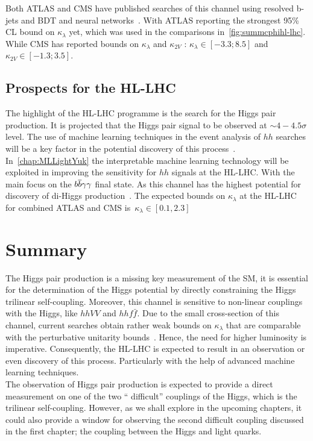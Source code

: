 Both ATLAS and CMS have published searches of this channel using resolved b-jets and BDT and neural networks~\cite{ATLAS:2021jki,CMS:2020tkr}. With ATLAS reporting the strongest 95\% CL bound on $\kappa_\lambda$ yet, which was used in the comparisons in~\autoref{fig:summcphihl-lhc}. While CMS has reported bounds on $\kappa_\lambda$ and $\kappa_{2V}$ : $\kappa_{\lambda} \in [-3.3;8.5]$ and $\kappa_{2V} \in [-1.3; 3.5]$.                                                                                       
\subsection{Prospects for the HL-LHC}
The highlight of the HL-LHC programme is the search for the Higgs pair production. It is projected that the Higgs pair signal to be observed at $\sim  4- 4.5\sigma $ level. The use of machine learning techniques in the event analysis of $hh$ searches will be a key factor in the potential discovery of this process~\cite{Cepeda:2019klc}. In~\autoref{chap:MLLightYuk} the interpretable machine learning technology will be exploited in improving the sensitivity for $hh$ signals at the HL-LHC. With the main focus on the $b\overline b\gamma\gamma$ final state. As this channel has the highest potential for discovery of di-Higgs production~\cite{Azatov:2015oxa, Baur:2003gp, Baglio:2012np, Kling:2016lay, Barger:2013jfa, Adhikary:2017jtu,Alves:2017ued}. The expected bounds on $\kappa_\lambda$ at the HL-LHC for combined ATLAS and CMS is~$\kappa_{\lambda} \in [0.1,2.3]$~\cite{DiMicco:2019ngk,Cepeda:2019klc}
 
\section{Summary \label{summtrilinear}  }
The Higgs pair production is a missing key measurement of the SM, it is essential for the determination of the Higgs potential by directly constraining the Higgs trilinear self-coupling. Moreover, this channel is sensitive to non-linear couplings with the Higgs, like $hhVV$ and $hh f\bar f$. Due to the small cross-section of this channel, current searches obtain rather weak bounds on $\kappa_{\lambda}$ that are comparable with the perturbative unitarity bounds~\cite{DiLuzio:2017tfn}. Hence, the need for higher luminosity is imperative. Consequently, the HL-LHC is expected to result in an observation or even discovery of this process. Particularly with the help of advanced machine learning techniques.\\ The observation of Higgs pair production is expected to provide a direct measurement on one of the two `` difficult'' couplings of the Higgs, which is the trilinear self-coupling. However, as we shall explore in the upcoming chapters, it could also provide a window for observing the second difficult coupling discussed in the first chapter; the coupling between the Higgs and light quarks. 
